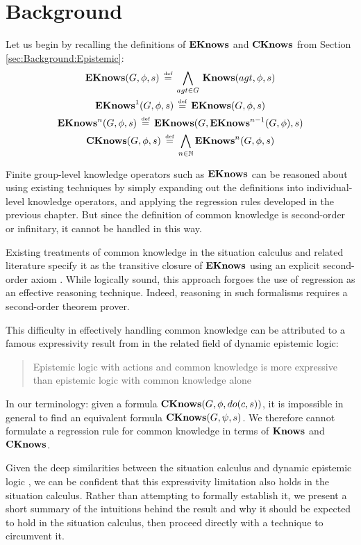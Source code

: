 \section{Background\label{sec:CKnowledge:Background}}

Let us begin by recalling the definitions of $\mathbf{EKnows}$ and $\mathbf{CKnows}$
from Section \ref{sec:Background:Epistemic}:\begin{gather*}
\mathbf{EKnows}(G,\phi,s)\,\stackrel{\mbox{\tiny def}}{=}\,\bigwedge_{agt\in G}\,\mathbf{Knows}(agt,\phi,s)\\
\mathbf{EKnows}^{1}(G,\phi,s)\,\stackrel{\mbox{\tiny def}}{=}\,\mathbf{EKnows}(G,\phi,s)\\
\mathbf{EKnows}^{n}(G,\phi,s)\,\stackrel{\mbox{\tiny def}}{=}\,\mathbf{EKnows}(G,\mathbf{EKnows}^{n-1}(G,\phi),s)\\
\mathbf{CKnows}(G,\phi,s)\,\stackrel{\mbox{\tiny def}}{=}\,\bigwedge_{n\in\mathbb{N}}\mathbf{EKnows}^{n}(G,\phi,s)\end{gather*}


Finite group-level knowledge operators such as $\mathbf{EKnows}$ can be reasoned
about using existing techniques by simply expanding out the definitions
into individual-level knowledge operators, and applying the regression
rules developed in the previous chapter. But since the definition
of common knowledge is second-order or infinitary, it cannot be handled
in this way.

Existing treatments of common knowledge in the situation calculus
and related literature specify it as the transitive closure of $\mathbf{EKnows}$
using an explicit second-order axiom \citep{davis05fo_ma_theory,ghaderi07sc_joint_ability}.
While logically sound, this approach forgoes the use of regression
as an effective reasoning technique. Indeed, reasoning in such formalisms
requires a second-order theorem prover.

This difficulty in effectively handling common knowledge can be attributed
to a famous expressivity result from \citet{baltag98pa_ck} in the
related field of dynamic epistemic logic:

\begin{quote}
Epistemic logic with actions and common knowledge is more expressive
than epistemic logic with common knowledge alone 
\end{quote}
In our terminology: given a formula $\mathbf{CKnows}(G,\phi,do(c,s))$, it
is impossible in general to find an equivalent formula $\mathbf{CKnows}(G,\psi,s)$.
We therefore cannot formulate a regression rule for common knowledge
in terms of $\mathbf{Knows}$ and $\mathbf{CKnows}$.

Given the deep similarities between the situation calculus and dynamic
epistemic logic \citep{vanbentham07ml_sitcalc}, we can be confident
that this expressivity limitation also holds in the situation calculus.
Rather than attempting to formally establish it, we present a short
summary of the intuitions behind the result and why it should be expected
to hold in the situation calculus, then proceed directly with a technique
to circumvent it.

